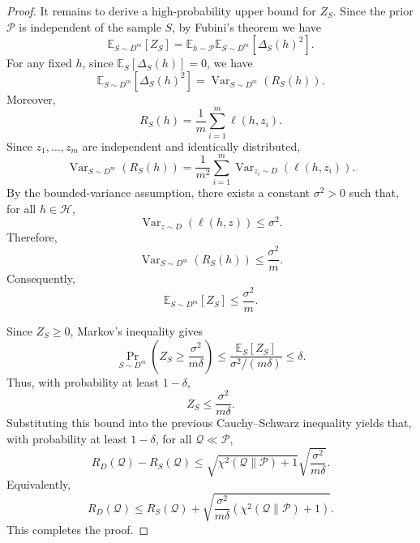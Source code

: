 \documentclass{article}
\theoremstyle{plain}
\theoremstyle{definition}
\theoremstyle{remark}
\begin{document}
\begin{proof}
It remains to derive a high-probability upper bound for $Z_S$. Since the prior $\mathcal P$ is independent of the sample $S$, by Fubini's theorem we have
\begin{equation}
\mathbb E_{S\sim D^m}[Z_S]
=
\mathbb E_{h\sim\mathcal P}
\mathbb E_{S\sim D^m}[\Delta_S(h)^2].
\end{equation}
For any fixed $h$, since $\mathbb E_S[\Delta_S(h)]=0$, we have
\begin{equation}
\mathbb E_{S\sim D^m}[\Delta_S(h)^2]
=
\operatorname{Var}_{S\sim D^m}(R_S(h)).
\end{equation}
Moreover,
\begin{equation}
R_S(h)=\frac{1}{m}\sum_{i=1}^m \ell(h,z_i).
\end{equation}
Since $z_1,\ldots,z_m$ are independent and identically distributed,
\begin{equation}
\operatorname{Var}_{S\sim D^m}(R_S(h))
=
\frac{1}{m^2}
\sum_{i=1}^m
\operatorname{Var}_{z_i\sim D}(\ell(h,z_i)).
\end{equation}
By the bounded-variance assumption, there exists a constant $\sigma^2>0$ such that, for all $h\in\mathcal H$,
\begin{equation}
\operatorname{Var}_{z\sim D}(\ell(h,z))\le \sigma^2.
\end{equation}
Therefore,
\begin{equation}
\operatorname{Var}_{S\sim D^m}(R_S(h))
\le
\frac{\sigma^2}{m}.
\end{equation}
Consequently,
\begin{equation}
\mathbb E_{S\sim D^m}[Z_S]
\le
\frac{\sigma^2}{m}.
\end{equation}

Since $Z_S\ge 0$, Markov's inequality gives
\begin{equation}
\Pr_{S\sim D^m}
\left(
Z_S
\ge
\frac{\sigma^2}{m\delta}
\right)
\le
\frac{\mathbb E_S[Z_S]}{\sigma^2/(m\delta)}
\le
\delta.
\end{equation}
Thus, with probability at least $1-\delta$,
\begin{equation}
Z_S
\le
\frac{\sigma^2}{m\delta}.
\end{equation}
Substituting this bound into the previous Cauchy--Schwarz inequality yields that, with probability at least $1-\delta$, for all $\mathcal Q\ll\mathcal P$,
\begin{equation}
R_D(\mathcal Q)-R_S(\mathcal Q)
\le
\sqrt{\chi^2(\mathcal Q\|\mathcal P)+1}
\sqrt{\frac{\sigma^2}{m\delta}}.
\end{equation}
Equivalently,
\begin{equation}
R_D(\mathcal Q)
\le
R_S(\mathcal Q)
+
\sqrt{
\frac{\sigma^2}{m\delta}
\left(
\chi^2(\mathcal Q\|\mathcal P)+1
\right)
}.
\end{equation}
This completes the proof.
\end{proof}
\end{document}
